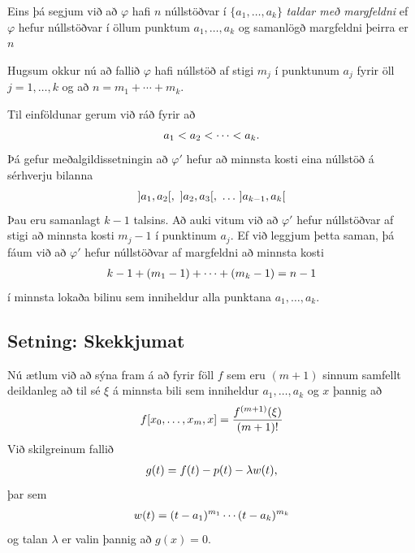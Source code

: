 \documentclass[letterpaper,10pt,icelandic]{sphinxmanual}
\begin{document}
Eins þá segjum við að \(\varphi\) hafi \(n\) núllstöðvar í
\(\{a_1,\dots,a_k\}\) \emph{taldar með margfeldni} ef \(\varphi\)
hefur núllstöðvar í öllum punktum \(a_1,\dots,a_k\) og samanlögð
margfeldni þeirra er \(n\)

Hugsum okkur nú að fallið \(\varphi\) hafi núllstöð af stigi
\(m_j\) í punktunum \(a_j\) fyrir öll \(j=1,\dots,k\) og að
\(n=m_1+\cdots+m_k\).

Til einföldunar gerum við ráð fyrir að
\begin{gather}
\begin{split}a_1<a_2<\cdots<a_k.\end{split}\notag
\end{gather}
Þá gefur meðalgildissetningin að \(\varphi'\) hefur að minnsta kosti
eina núllstöð á sérhverju bilanna
\begin{gather}
\begin{split}]a_1,a_2[, \  ]a_2,a_3[, \ \dots \  ]a_{k-1},a_k[\end{split}\notag
\end{gather}
Þau eru samanlagt \(k-1\) talsins. Að auki vitum við að
\(\varphi'\) hefur núllstöðvar af stigi að minnsta kosti
\(m_j-1\) í punktinum \(a_j\). Ef við leggjum þetta saman, þá
fáum við að \(\varphi'\) hefur núllstöðvar af margfeldni að minnsta
kosti
\begin{gather}
\begin{split}k-1+(m_1-1)+\cdots+(m_k-1)=n-1\end{split}\notag
\end{gather}
í minnsta lokaða bilinu sem inniheldur alla punktana
\(a_1,\dots,a_k\).


\subsection{Setning: Skekkjumat}
\label{kafli03:setning-skekkjumat}
Nú ætlum við að sýna fram á að fyrir föll \(f\) sem eru
\((m+1)\) sinnum samfellt deildanleg að til sé \(\xi\) á minnsta
bili sem inniheldur \(a_1, \ldots, a_k\) og \(x\) þannig að
\begin{gather}
\begin{split}f[x_0,\ldots,x_m,x] = \frac{f^{(m+1)}(\xi)}{(m+1)!}\end{split}\notag
\end{gather}
Við skilgreinum fallið
\begin{gather}
\begin{split}g(t) = f(t) - p(t) - \lambda w(t),\end{split}\notag
\end{gather}
þar sem
\begin{gather}
\begin{split}w(t) = (t-a_1)^{m_1} \cdots (t-a_k)^{m_k}\end{split}\notag
\end{gather}
og talan \(\lambda\) er valin þannig að \(g(x) = 0\).
\end{document}
